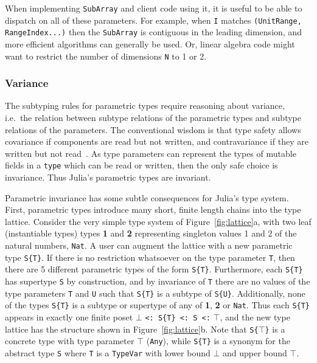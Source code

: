 \documentclass[pldi]{sigplanconf-pldi15}
\begin{document}
When implementing \verb|SubArray| and client code using it, it is useful
to be able to dispatch on all of these parameters. For example, when
\verb|I| matches \verb|(UnitRange, RangeIndex...)| then the \verb|SubArray|
is contiguous in the leading dimension, and more efficient algorithms can
generally be used. Or, linear algebra code might want to restrict the
number of dimensions \verb|N| to 1 or 2.

\subsubsection{Variance}

The subtyping rules for parametric types require reasoning about variance,
i.e.\ the relation between subtype relations of the parametric types and
subtype relations of the parameters. The conventional wisdom is that type
safety allows covariance if components are read but not written, and
contravariance if they are written but not read~\cite{Castagna1995}. As type
parameters can represent the types of mutable fields in a \verb|type| which can
be read or written, then the only safe choice is invariance. Thus Julia's
parametric types are invariant.

Parametric invariance has some subtle consequences for Julia's type system.
First, parametric types introduce many short, finite length chains into the
type lattice. Consider the very simple type system of
Figure~\ref{fig:lattice}a, with two leaf (instantiable types) types \textbf{1}
and \textbf{2} representing singleton values 1 and 2 of the natural numbers,
\verb|Nat|. A user can augment the lattice with a new parametric type
\verb|S{T}|. If there is no restriction whatsoever on the type parameter
\verb|T|, then there are 5 different parametric types of the form \verb|S{T}|.
Furthermore, each \verb|S{T}| has supertype \verb|S| by construction, and by
invariance of \verb|T| there are no values of the type parameters \verb|T| and
\verb|U| such that \verb|S{T}| is a subtype of \verb|S{U}|. Additionally, none
of the types \verb|S{T}| is a subtype or supertype of any of \textbf{1},
\textbf{2} or \verb|Nat|. Thus each \verb|S{T}| appears in exactly one finite
poset $\bot$ \verb|<: S{T} <: S <:| $\top$, and the new type lattice has the
structure shown in Figure~\ref{fig:lattice}b. Note that \verb|S{|$\top$\verb|}|
is a concrete type with type parameter $\top$ (\verb|Any|), while \verb|S{T}|
is a synonym for the abstract type \verb|S| where \verb|T| is a \verb|TypeVar|
with lower bound $\bot$ and upper bound $\top$. 
\end{document}
